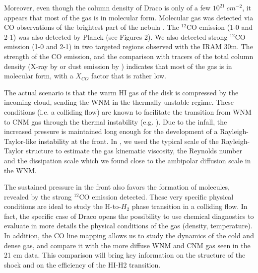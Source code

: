 \documentclass[traditabstract]{aa}
\begin{document}
Moreover, even though the column density of Draco is only of a few $10^{21}\: cm^{-2}$, it appears that most of the gas is in 
molecular form. Molecular gas was detected via CO observations of the brightest part of the nebula \citep{Mebold_1985,Rohlfs_1989}. 
The $^{12}$CO emission (1-0 and 2-1) was also detected by Planck (see Figures 2). We also detected strong $^{12}$CO emission 
(1-0 and 2-1) in two targeted regions observed with the IRAM 30m. The strength of the CO emission, and the comparison with tracers 
of the total column density (X-ray by \citealt{Moritz_1998} or dust emission by \citealt{Herbstmeier_1993,Planck_XXIV_2011}) 
indicates that most of the gas is in molecular form, with a $X_{CO}$ factor that is rather low.

The actual scenario is that the warm HI gas of the disk is compressed by the incoming cloud, sending the WNM in the thermally 
unstable regime. These conditions (i.e. a colliding flow) are known to facilitate the transition from WNM to CNM gas through the 
thermal instability (e.g. \citealt{Saury_2014}). Due to the infall, the increased pressure is maintained long enough for the 
development of a Rayleigh-Taylor-like instability at the front. In \cite{MAMD_2017b}, we used the typical scale of the 
Rayleigh-Taylor structure to estimate the gas kinematic viscosity, the Reynolds number and the dissipation scale which we 
found close to the ambipolar diffusion scale in the WNM.

The sustained pressure in the front also favors the formation of molecules, revealed by the strong $^{12}$CO emission detected. 
These very specific physical conditions are ideal to study the H-to-$H_2$ phase transition in a colliding flow. 
In fact, the specific case of Draco opens the possibility to use chemical diagnostics to evaluate in more details the physical 
conditions of the gas (density, temperature). In addition, the CO line mapping allows us to study the dynamics of the 
cold and dense gas, and compare it with the more diffuse WNM and CNM gas seen in the 21 cm data. This comparison will 
bring key information on the structure of the shock and on the efficiency of the HI-H2 transition.

%
%
\end{document}
